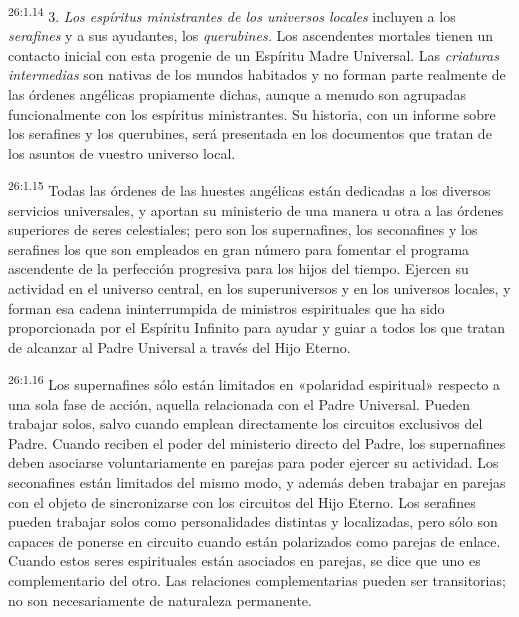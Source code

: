 \par
\textsuperscript{26:1.14} 3. \textit{Los espíritus ministrantes de los universos locales} incluyen a los \textit{serafines} y a sus ayudantes, los \textit{querubines.} Los ascendentes mortales tienen un contacto inicial con esta progenie de un Espíritu Madre Universal. Las \textit{criaturas intermedias} son nativas de los mundos habitados y no forman parte realmente de las órdenes angélicas propiamente dichas, aunque a menudo son agrupadas funcionalmente con los espíritus ministrantes. Su historia, con un informe sobre los serafines y los querubines, será presentada en los documentos que tratan de los asuntos de vuestro universo local.

\par
\textsuperscript{26:1.15} Todas las órdenes de las huestes angélicas están dedicadas a los diversos servicios universales, y aportan su ministerio de una manera u otra a las órdenes superiores de seres celestiales; pero son los supernafines, los seconafines y los serafines los que son empleados en gran número para fomentar el programa ascendente de la perfección progresiva para los hijos del tiempo. Ejercen su actividad en el universo central, en los superuniversos y en los universos locales, y forman esa cadena ininterrumpida de ministros espirituales que ha sido proporcionada por el Espíritu Infinito para ayudar y guiar a todos los que tratan de alcanzar al Padre Universal a través del Hijo Eterno.

\par
\textsuperscript{26:1.16} Los supernafines sólo están limitados en «polaridad espiritual» respecto a una sola fase de acción, aquella relacionada con el Padre Universal. Pueden trabajar solos, salvo cuando emplean directamente los circuitos exclusivos del Padre. Cuando reciben el poder del ministerio directo del Padre, los supernafines deben asociarse voluntariamente en parejas para poder ejercer su actividad. Los seconafines están limitados del mismo modo, y además deben trabajar en parejas con el objeto de sincronizarse con los circuitos del Hijo Eterno. Los serafines pueden trabajar solos como personalidades distintas y localizadas, pero sólo son capaces de ponerse en circuito cuando están polarizados como parejas de enlace. Cuando estos seres espirituales están asociados en parejas, se dice que uno es complementario del otro. Las relaciones complementarias pueden ser transitorias; no son necesariamente de naturaleza permanente.

